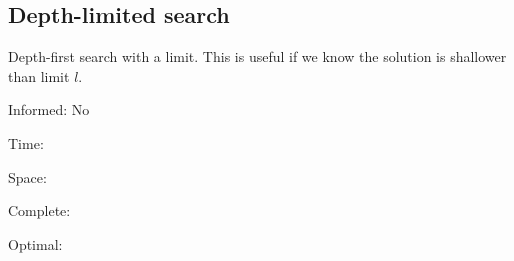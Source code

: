 
\subsection{Depth-limited search}

Depth-first search with a limit. This is useful if we know the solution is shallower than limit \(l\).

Informed: No

Time:

Space:

Complete:

Optimal:

